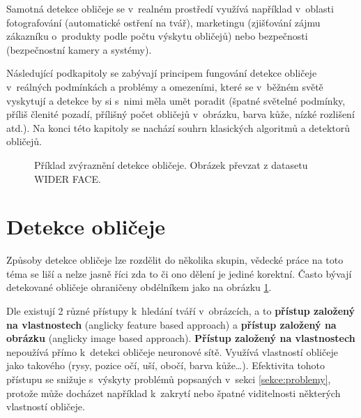 Samotná detekce obličeje se v~realném prostředí využívá například v~oblasti fotografování (automatické ostření na tvář), marketingu (zjišťování zájmu zákazníku o~produkty podle počtu výskytu obličejů) nebo bezpečnosti (bezpečnostní kamery a systémy).

Následující podkapitoly se zabývají principem fungování detekce obličeje v~reálných podmínkách a problémy a omezeními, které se v~běžném světě vyskytují a detekce by si s~nimi měla umět poradit (špatné světelné podmínky, příliš členité pozadí, přílišný počet obličejů v~obrázku, barva kůže, nízké rozlišení atd.). Na konci této kapitoly se nachází souhrn klasických algoritmů a detektorů obličejů.

\begin{figure}[H]
  \begin{center}
  \label{obrazek:fdexample}
  \caption{Příklad zvýraznění detekce obličeje. Obrázek převzat z datasetu WIDER FACE.}
  \end{center}
\end{figure}

\section{Detekce obličeje}
Způsoby detekce obličeje lze rozdělit do několika skupin, vědecké práce na toto téma se liší a nelze jasně říci zda to či ono dělení je jediné korektní. Často bývají detekované obličeje ohraničeny obdélníkem jako na obrázku \ref{obrazek:fdexample}.

Dle \cite{fdReview} existují 2 různé přístupy k~hledání tváří v~obrázcích, a to \textbf{přístup založený na vlastnostech} (anglicky feature based approach) a \textbf{přístup založený na obrázku} (anglicky image based approach). 
\textbf{Přístup založený na vlastnostech} nepoužívá přímo k~detekci obličeje neuronové sítě. Využívá vlastností obličeje jako takového (rysy, pozice očí, uší, obočí, barva kůže\dots). Efektivita tohoto přístupu se snižuje s~výskyty problémů popsaných v~sekci \ref{sekce:problemy}, protože může docházet například k~zakrytí nebo špatné viditelnosti některých vlastností obličeje.

